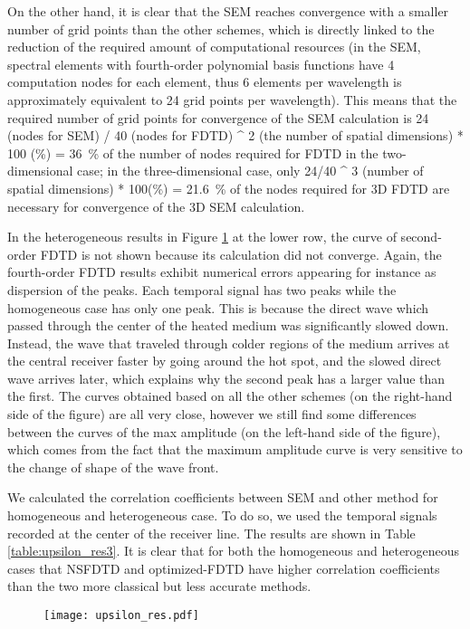 On the other hand, it is clear that the SEM reaches convergence with a smaller
number of grid points than the other schemes, which is directly linked to the reduction of the required amount of computational resources (in the SEM,
spectral elements with fourth-order polynomial basis functions have 4 computation nodes for each element, thus 6 elements per wavelength is approximately equivalent to 24 grid points
per wavelength). This means that the required number of grid points for convergence of the SEM calculation is 24 (nodes for SEM) / 40 (nodes for FDTD) \string^ 2 (the number of spatial dimensions) * 100 (\%) = \SI{36}{\percent} of the number of nodes required for FDTD in the two-dimensional case;
in the three-dimensional case, only 24/40 \string^ 3 (number of spatial dimensions) * 100(\%) = \SI{21.6}{\percent} of the nodes required for 3D FDTD are necessary for convergence of the 3D SEM calculation.

\noindent
        In the heterogeneous results in Figure \ref{fig:upsilon_res1} at the lower row, the curve of second-order FDTD is not shown because its calculation did not converge.
Again, the fourth-order FDTD results exhibit numerical errors appearing for instance as dispersion of the peaks. Each temporal signal has two peaks
while the homogeneous case has only one peak. This is because the direct wave which passed through the center of the heated medium was significantly slowed down.
Instead, the wave that traveled through colder regions of the medium arrives at the central receiver faster by going around the hot spot, and the slowed direct
wave arrives later, which explains why the second peak has a larger value than the first.
        The curves obtained based on all the other schemes (on the right-hand side of the figure) are all very close,
however we still find some differences between the curves of the max amplitude (on the left-hand side of the figure),
which comes from the fact that the maximum amplitude curve is very sensitive to the change of shape of the wave front.

        We calculated the correlation coefficients between SEM and other method for homogeneous and heterogeneous case. To do so, we used the temporal signals recorded at the
center of the receiver line. The results are shown in Table \ref{table:upsilon_res3}. It is clear that for both the homogeneous and heterogeneous cases that NSFDTD
and optimized-FDTD have higher correlation coefficients than the two more classical but less accurate methods.

        \begin{figure}[htbp]
                \centerline{\texttt{[image: upsilon\_res.pdf]}}
            \label{fig:upsilon_res1}
        \end{figure}

